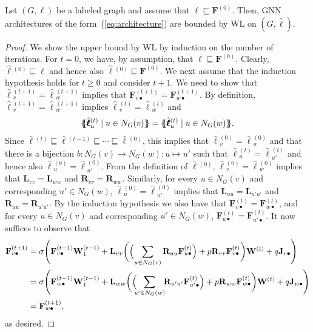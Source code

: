 \begin{theorem}\label{thm:generalbound}
Let $(G,\pmb{\ell})$ be a labeled graph and assume that $\pmb{\ell}\sqsubseteq\mathbf{F}^{(0)}$.
Then, GNN architectures of the form~(\ref{eq:architecture}) are bounded by WL on $(G,\hat{\pmb{\ell}})$.
\end{theorem}
\begin{proof}
We show the upper bound by WL by induction on the number of iterations. For $t=0$, we have, by assumption, that 
$\pmb{\ell}\sqsubseteq \mathbf{F}^{(0)}$. Clearly,
$\hat{\pmb{\ell}}{}^{(0)}\sqsubseteq \pmb{\ell}$ and hence also 
$\hat{\pmb{\ell}}{}^{(0)}\sqsubseteq\mathbf{F}^{(0)}$. We next assume that the induction hypothesis holds for $t\geq 0$ and consider $t+1$. We need to show that 
$\hat{\pmb{\ell}}{}^{(t+1)}_v=\hat{\pmb{\ell}}{}^{(t+1)}_w$ implies that $\mathbf{F}^{(t+1)}_{v\bullet}=\mathbf{F}^{(t+1)}_{w\bullet}$. By definition,
$\hat{\pmb{\ell}}{}^{(t+1)}_v=\hat{\pmb{\ell}}{}^{(t+1)}_w$ implies
$\hat{\pmb{\ell}}{}^{(t)}_v=\hat{\pmb{\ell}}{}^{(t)}_w$ and 
$$
\ldbl \hat{\pmb{\ell}}{}^{(t)}_u \st u \in N_G(v) \rdbl=
 \ldbl \hat{\pmb{\ell}}{}^{(t)}_u \st u \in N_G(w) \rdbl.$$
 Since $\hat{\pmb{\ell}}{}^{(t)}\sqsubseteq \hat{\pmb{\ell}}{}^{(t-1)}\sqsubseteq \cdots\sqsubseteq \hat{\pmb{\ell}}{}^{(0)}$, this implies that
 $\hat{\pmb{\ell}}{}^{(0)}_v=\hat{\pmb{\ell}}{}^{(0)}_w$ and that there is a bijection $b:N_G(v)\to N_G(w):u\mapsto u'$ such that $\hat{\pmb{\ell}}{}^{(t)}_u=\hat{\pmb{\ell}}{}^{(t)}_{u'}$ and hence also 
 $\hat{\pmb{\ell}}{}^{(0)}_u=\hat{\pmb{\ell}}{}^{(0)}_{u'}$. From the definition of $\hat{\pmb{\ell}}{}^{(0)}$, $\hat{\pmb{\ell}}{}^{(0)}_v=\hat{\pmb{\ell}}{}^{(0)}_w$ implies that
 $\mathbf{L}_{vv}=\mathbf{L}_{ww}$ and
 $\mathbf{R}_{vv}=\mathbf{R}_{ww}$. Similarly, for every $u\in N_G(v)$ and corresponding $u'\in N_G(w)$,
$\hat{\pmb{\ell}}{}^{(0)}_u=\hat{\pmb{\ell}}{}^{(0)}_{u'}$ implies that   $\mathbf{L}_{uu}=\mathbf{L}_{u'u'}$ and $\mathbf{R}_{uu}=\mathbf{R}_{u'u'}$. By the induction hypothesis we also have that
 $\mathbf{F}^{(t)}_{v\bullet}=\mathbf{F}^{(t)}_{w\bullet}$, and for every $u\in N_G(v)$
   and corresponding $u'\in N_G(w)$, $\mathbf{F}^{(t)}_{u\bullet}=\mathbf{F}^{(t)}_{u'\bullet}$. It now suffices to observe that
  \begin{align*}
	  \mathbf{F}^{(t+1)}_{v\bullet}&=\sigma\Biggl(\mathbf{F}^{(t-1)}_{v\bullet}\mathbf{W}_1^{(t-1)}+\mathbf{L}_{vv}\biggl(\Bigl(\sum_{u\in N_G(v)} \mathbf{R}_{uu}\mathbf{F}^{(t)}_{u\bullet}\Bigr)+p\mathbf{R}_{vv}\mathbf{F}^{(t)}_{v\bullet}\biggr)\mathbf{W}^{(t)}+ q\mathbf{J}_{v\bullet}\Biggr)\\
	 & =\sigma\Biggl(\mathbf{F}^{(t-1)}_{w\bullet}\mathbf{W}_1^{(t-1)}+\mathbf{L}_{ww}\biggl(\Bigl(\!\!\sum_{u'\in N_G(w)}\!\! \mathbf{R}_{u'u'}\mathbf{F}^{(t)}_{u'\bullet}\Bigr)+p\mathbf{R}_{ww}\mathbf{F}^{(t)}_{w\bullet}\biggr)\mathbf{W}^{(t)}+ q\mathbf{J}_{w\bullet}\Biggr)\\
	  &=\mathbf{F}^{(t+1)}_{w\bullet},
\end{align*}
as desired.
\end{proof}

